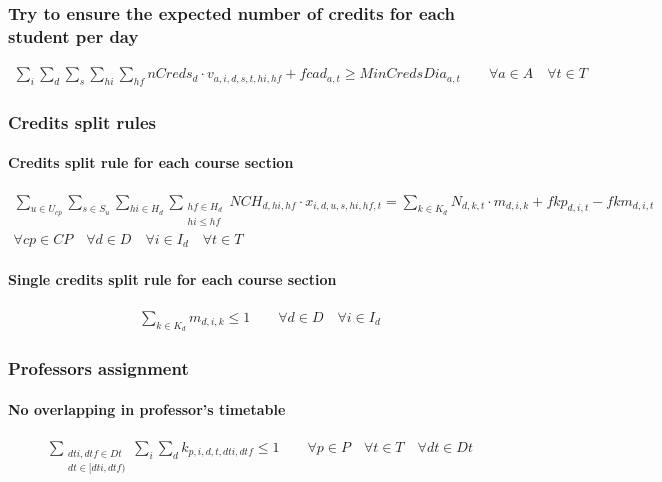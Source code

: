 \subsubsection{Try to ensure the expected number of credits for each student per day}
\begin{eqnarray}
\sum\limits_{i} \sum\limits_{d} \sum\limits_{s} \sum\limits_{hi} \sum\limits_{hf} nCreds_{d} \cdot v_{a,i,d,s,t,hi,hf} + fcad_{a,t} \ge MinCredsDia_{a,t} \nonumber \qquad
\forall a \in A \quad
\forall t \in T
\end{eqnarray}


\subsubsection{Credits split rules}

\paragraph{Credits split rule for each course section}
\begin{eqnarray}
\sum\limits_{u \in U_{cp}} \sum\limits_{s \in S_{u}} \sum\limits_{hi \in H_{d}} \sum_{\substack {hf \in H_{d} \\ hi\le hf}}
 NCH_{d,hi,hf} \cdot x_{i,d,u,s,hi,hf,t} = \sum\limits_{k \in K_{d}}N_{d,k,t} \cdot m_{d,i,k} + fkp_{d,i,t} - fkm_{d,i,t} \nonumber \qquad 
\\
\forall cp \in CP \quad
\forall d \in D \quad
\forall i \in I_{d} \quad
\forall t \in T
\end{eqnarray}

\paragraph{Single credits split rule for each course section}
\begin{eqnarray}
\sum\limits_{k \in K_{d}} m_{d,i,k} \leq 1 \nonumber \qquad 
\forall d \in D \quad
\forall i \in I_{d}
\end{eqnarray}


\subsubsection{Professors assignment}

\paragraph{No overlapping in professor's timetable}
\begin{eqnarray}
\sum_{ \substack {dti,dtf \in Dt \\ dt \in [dti,dtf)} } \sum\limits_{i} \sum\limits_{d} k_{p,i,d,t,dti,dtf} \le 1 \nonumber \qquad
\forall p \in P \quad
\forall t \in T \quad
\forall dt \in Dt
\end{eqnarray}

